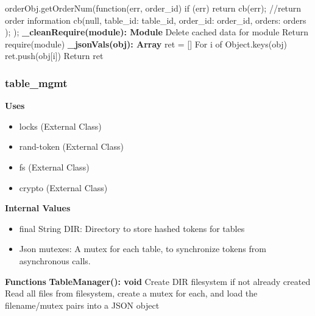 \documentclass [10pt]{article}
\begin{document}
\newline
orderObj.getOrderNum(function(err, order\_id) { \newline
	if (err) { \newline
		return cb(err); \newline
	} \newline
	//return order information \newline
	cb(null, { \newline
		table\_id: table\_id, \newline
		order\_id: order\_id, \newline
		orders: orders \newline
	}); \newline
}); \newline
 \newline
\textbf{\_cleanRequire(module): Module} \newline
Delete cached data for module \newline
Return require(module) \newline
 \newline
\textbf{\_jsonVals(obj): Array} \newline
ret = [] \newline
For i of Object.keys(obj) \newline
	ret.push(obj[i]) \newline
Return ret \newline

\subsubsection{table\_mgmt}
\textbf{Uses}
\begin{itemize}
	\item locks (External Class)
	\item rand-token (External Class)
	\item fs (External Class)
	\item crypto (External Class)
\end{itemize}

\textbf{Internal Values}
\begin{itemize}
	\item final String DIR: Directory to store hashed tokens for tables
	\item Json mutexes: A mutex for each table, to synchronize tokens from asynchronous calls.
\end{itemize}

\textbf{Functions}
\textbf{TableManager(): void}
Create DIR filesystem if not already created
Read all files from filesystem, create a mutex for each, and load the filename/mutex pairs into a JSON object
\end{document}
